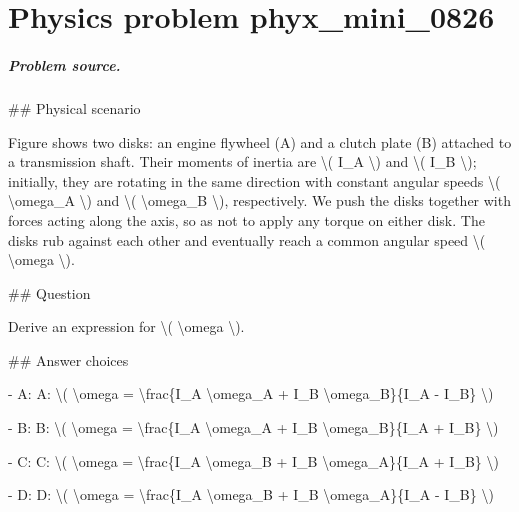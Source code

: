 
\chapter{Physics problem phyx\_mini\_0826}
\label{ch:PhyXMiniProblems_problem_phyx_mini_0826}

\paragraph{Problem source.}
\#\# Physical scenario

Figure shows two disks: an engine flywheel (A) and a clutch plate (B) attached to a transmission shaft. Their moments of inertia are \textbackslash{}( I\_A \textbackslash{}) and \textbackslash{}( I\_B \textbackslash{}); initially, they are rotating in the same direction with constant angular speeds \textbackslash{}( \textbackslash{}omega\_A \textbackslash{}) and \textbackslash{}( \textbackslash{}omega\_B \textbackslash{}), respectively. We push the disks together with forces acting along the axis, so as not to apply any torque on either disk. The disks rub against each other and eventually reach a common angular speed \textbackslash{}( \textbackslash{}omega \textbackslash{}).

\#\# Question

Derive an expression for \textbackslash{}( \textbackslash{}omega \textbackslash{}).

\#\# Answer choices

- A: A: \textbackslash{}( \textbackslash{}omega = \textbackslash{}frac\{I\_A \textbackslash{}omega\_A + I\_B \textbackslash{}omega\_B\}\{I\_A - I\_B\} \textbackslash{})

- B: B: \textbackslash{}( \textbackslash{}omega = \textbackslash{}frac\{I\_A \textbackslash{}omega\_A + I\_B \textbackslash{}omega\_B\}\{I\_A + I\_B\} \textbackslash{})

- C: C: \textbackslash{}( \textbackslash{}omega = \textbackslash{}frac\{I\_A \textbackslash{}omega\_B + I\_B \textbackslash{}omega\_A\}\{I\_A + I\_B\} \textbackslash{})

- D: D: \textbackslash{}( \textbackslash{}omega = \textbackslash{}frac\{I\_A \textbackslash{}omega\_B + I\_B \textbackslash{}omega\_A\}\{I\_A - I\_B\} \textbackslash{})

